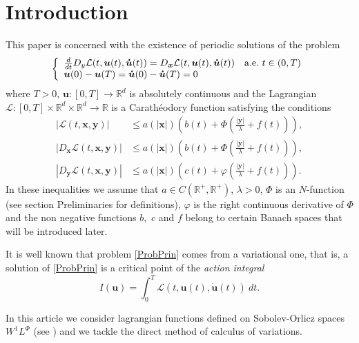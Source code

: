 \documentclass[twoside]{article}
\theoremstyle{remark}
\renewcommand{\b}[1]{\boldsymbol{#1}}
\newcommand{\rr}{\mathbb{R}}
\renewcommand{\leq}{\leqslant}
\begin{document}
\section{Introduction}
This paper is concerned with the existence of periodic solutions of the problem
\begin{equation}\label{ProbPrin}
    \left\{%
\begin{array}{ll}
   \frac{d}{dt} D_{y}\mathcal{L}(t,\b{u}(t),\b{\dot{u}}(t))= D_{\b{x}}\mathcal{L}(t,\b{u}(t),\b{\dot{u}}(t)) \quad \hbox{a.e.}\ t \in (0,T)\\
    \b{u}(0)-\b{u}(T)=\b{\dot{u}}(0)-\b{\dot{u}}(T)=0
\end{array}%
\right.
\end{equation}
where $T>0$, $\b{u}:[0,T]\to\rr^d$ is absolutely continuous and the Lagrangian $\mathcal{L}:[0,T]\times\rr^d\times\rr^d\to\rr$ is a Carath\'eodory function satisfying the conditions
\begin{eqnarray}
|\mathcal{L}(t,\b{x},\b{y})| &\leq a(|\b{x}|)\left(b(t)+ \Phi\left(\frac{|\b{y}|}{\lambda}+f(t) \right)\right),\label{cotaL}\\
|D_{\b{x}}\mathcal{L}(t,\b{x},\b{y})| &\leq a(|\b{x}|)\left(b(t)+ \Phi\left(\frac{|\b{y}|}{\lambda}+f(t) \right)\right),\label{cotaDxL}\\
|D_{\b{y}}\mathcal{L}(t,\b{x},\b{y})| &\leq a(|\b{x}|)\left(c(t)+ \varphi\left(\frac{|\b{y}|}{\lambda}+f(t)\right)  \right).\label{cotaDyL}
\end{eqnarray}
In these inequalities we assume that  $a\in C(\mathbb{R}^+,\mathbb{R}^+)$, $\lambda>0$, $\Phi$ is an $N$-function (see section  Preliminaries  for definitions), $\varphi$ is the right continuous derivative of $\Phi$ and the non negative functions  $b,$ $c$ and $f$ belong to certain Banach spaces that  will be introduced later.



It is well known that problem \eqref{ProbPrin} comes from a variational one, that is,  a solution of \eqref{ProbPrin}  
is a critical point of the \emph{action integral}
\begin{equation}\label{integral_accion}
I(\b{u})=\int_{0}^T \mathcal{L}(t,\b{u}(t),\b{\dot{u}}(t))\ dt.
\end{equation}


In this article  we consider lagrangian functions  defined on Sobolev-Orlicz spaces $W^{1}L^{\Phi}$    
(see \cite{adams_sobolev,KR, rao1991theory,2002applications}) 
and we tackle  the direct method of calculus of variations.
\end{document}
